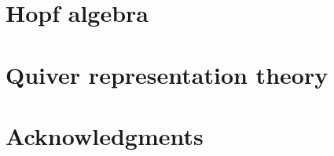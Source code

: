 \documentclass{amsart}
\theoremstyle{definition}
\begin{document}

\section{Hopf algebra}
\label{sec:HopfAlgebra}


\section{Quiver representation theory}
\label{subsec:representationTheory}


\section*{Acknowledgments}




\label{sec:biblio}
\end{document}
